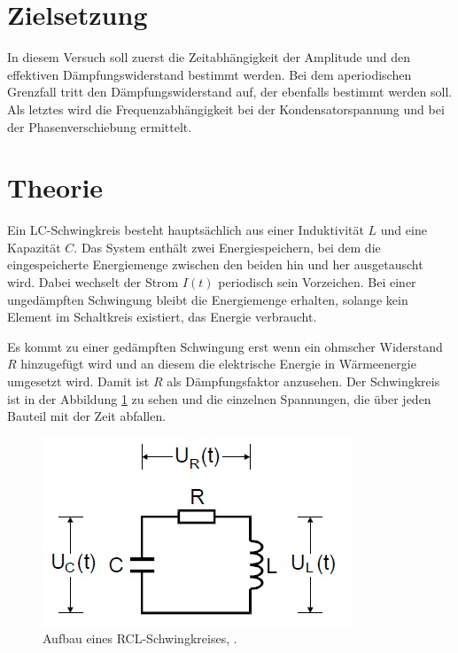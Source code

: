 \section{Zielsetzung}
\label{sec:Zielsetzung}
In diesem Versuch soll zuerst die Zeitabhängigkeit der Amplitude und den effektiven Dämpfungswiderstand bestimmt werden. Bei dem aperiodischen Grenzfall tritt den Dämpfungswiderstand auf, der ebenfalls bestimmt werden soll. Als letztes wird die Frequenzabhängigkeit bei der Kondensatorspannung und bei der Phasenverschiebung ermittelt. 
\section{Theorie}
\label{sec:Theorie}
Ein LC-Schwingkreis besteht hauptsächlich aus einer Induktivität $L$ und eine Kapazität $C$. Das System enthält zwei Energiespeichern, bei dem die eingespeicherte Energiemenge zwischen den beiden hin und her ausgetauscht wird. Dabei wechselt der Strom $I(t)$ periodisch sein Vorzeichen. 
Bei einer ungedämpften Schwingung bleibt die Energiemenge erhalten, solange kein Element im Schaltkreis existiert, das Energie verbraucht. 

Es kommt zu einer gedämpften Schwingung erst wenn ein ohmscher Widerstand $R$ hinzugefügt wird und an diesem die elektrische Energie in Wärmeenergie umgesetzt wird. Damit ist $R$ als Dämpfungsfaktor anzusehen. Der Schwingkreis ist in der Abbildung \ref{fig:schwingkreisrcl} zu sehen und die einzelnen Spannungen, die über jeden Bauteil mit der Zeit abfallen. 
\begin{figure}[h!]
	\centering
	\includegraphics[width=0.7\linewidth]{SchwingkreisRCL}
	\caption{Aufbau eines RCL-Schwingkreises, \cite[1]{anleitung354}.}
	\label{fig:schwingkreisrcl}
\end{figure}
 

